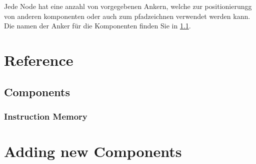 \documentclass[
	ngerman,
	accentcolor=9c,%
	type=intern,
	marginpar=false
	]{article}
\begin{document}
Jede Node hat eine anzahl von vorgegebenen Ankern, welche zur positionierungg von anderen komponenten oder auch zum pfadzeichnen verwendet werden kann. Die namen der Anker für die Komponenten finden Sie in \ref{components}.



\section{Reference}
\subsection{Components}\label{components}

\subsubsection{Instruction Memory}





\section{Adding new Components}
\end{document}
